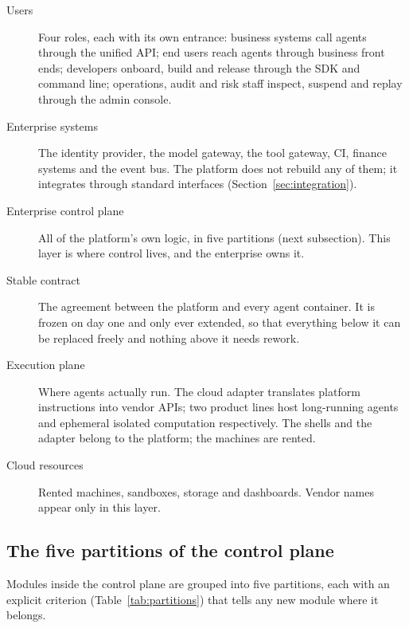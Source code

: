 \begin{description}
  \item[Users] Four roles, each with its own entrance: business systems call agents through the unified API; end users reach agents through business front ends; developers onboard, build and release through the SDK and command line; operations, audit and risk staff inspect, suspend and replay through the admin console.
  \item[Enterprise systems] The identity provider, the model gateway, the tool gateway, CI, finance systems and the event bus. The platform does not rebuild any of them; it integrates through standard interfaces (Section~\ref{sec:integration}).
  \item[Enterprise control plane] All of the platform's own logic, in five partitions (next subsection). This layer is where control lives, and the enterprise owns it.
  \item[Stable contract] The agreement between the platform and every agent container. It is frozen on day one and only ever extended, so that everything below it can be replaced freely and nothing above it needs rework.
  \item[Execution plane] Where agents actually run. The cloud adapter translates platform instructions into vendor APIs; two product lines host long-running agents and ephemeral isolated computation respectively. The shells and the adapter belong to the platform; the machines are rented.
  \item[Cloud resources] Rented machines, sandboxes, storage and dashboards. Vendor names appear only in this layer.
\end{description}

\subsection{The five partitions of the control plane}

Modules inside the control plane are grouped into five partitions, each with an explicit criterion (Table~\ref{tab:partitions}) that tells any new module where it belongs.

